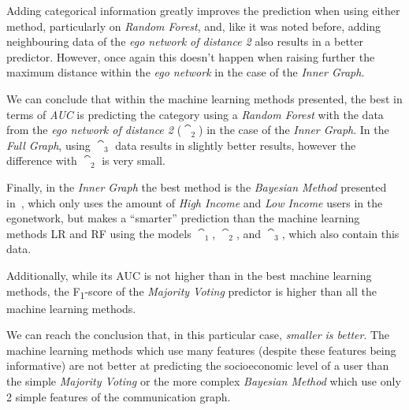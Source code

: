 Adding categorical information greatly improves the prediction when using either method, particularly on \emph{Random Forest}, and, like it was noted before, adding neighbouring data of the \emph{ego network of distance 2} also results in a better predictor. However, once again this doesn't happen when raising further the maximum distance within the \emph{ego network} in the case of the \emph{Inner Graph}.

We can conclude that within the {machine learning} methods presented, the best in terms of \emph{AUC} is predicting the category using a \emph{Random Forest} with the data from the \emph{ego network of distance 2} ($\cat_2$) in the case of the \emph{Inner Graph}. In the \emph{Full Graph}, using $\cat_3$ data results in slightly better results, however the difference with $\cat_2$ is very small.

Finally, in the \emph{Inner Graph} the best method is the \emph{Bayesian Method} presented in~\cite{fixmanasonam2016}, which only uses the amount of \emph{High Income} and \emph{Low Income} users in the egonetwork, but makes a ``smarter'' prediction than the {machine learning} methods LR and RF using the models $\cat_1$, $\cat_2$, and $\cat_3$, which also contain this data. 

Additionally, while its AUC is not higher than in the best {machine learning} methods, the F\textsubscript{1}-score of the \emph{Majority Voting} predictor is higher than all the {machine learning} methods.

We can reach the conclusion that, in this particular case, \emph{smaller is better}. The {machine learning} methods which use many features (despite these features being informative) are not better at predicting the socioeconomic level of a user than the simple \emph{Majority Voting} or the more complex \emph{Bayesian Method} which use only 2 simple features of the communication graph.



